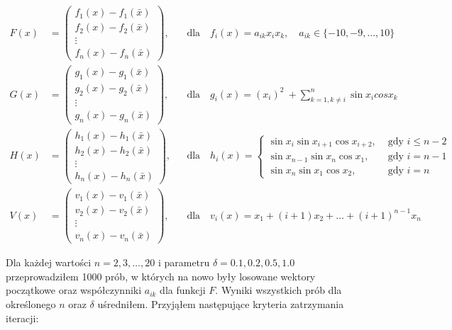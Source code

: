 \documentclass[11pt,wide]{mwart}
\begin{document}
\begin{align}
	F(x) &= 
	\left(\begin{matrix}
		f_1(x) - f_1(\bar{x}) \\ 
		f_2(x) - f_2(\bar{x}) \\ 
		\vdots\\ 
		f_n(x) - f_n(\bar{x})
	\end{matrix}\right), && \text{dla} \quad f_i(x) = a_{ik}x_ix_k, \quad a_{ik} \in \{-10, -9, \ldots, 10 \} \label{eq:F}\\
	G(x) &=
	\left(\begin{matrix}
	g_1(x) - g_1(\bar{x}) \\ 
	g_2(x) - g_2(\bar{x}) \\ 
	\vdots\\ 
	g_n(x) - g_n(\bar{x})
\end{matrix}\right), && \text{dla} \quad g_i(x) = (x_i)^2\ + \sum_{k=1, k\neq i}^{n}\sin{x_i}cos{x_k} \label{eq:G}\\
	H(x) &= 
	\left(\begin{matrix}
	h_1(x) - h_1(\bar{x}) \\ 
	h_2(x) - h_2(\bar{x}) \\ 
	\vdots\\ 
	h_n(x) - h_n(\bar{x})
\end{matrix}\right), && \text{dla} \quad h_i(x) = 
		\begin{cases}  
			\sin{x_i}\sin{x_{i+1}}\cos{x_{i+2}}, & \text{ gdy } i \leq n-2 \\
			\sin{x_{n-1}}\sin{x_{n}}\cos{x_{1}}, & \text{ gdy } i = n - 1 \\
			\sin{x_n}\sin{x_{1}}\cos{x_{2}}, & \text{ gdy } i = n
		\end{cases} \label{eq:H} \\
	V(x) &=
	\left(\begin{matrix}
		v_1(x) - v_1(\bar{x}) \\ 
		v_2(x) - v_2(\bar{x}) \\ 
		\vdots\\ 
		v_n(x) - v_n(\bar{x})
	\end{matrix}\right), && \text{dla} \quad v_i(x) = x_1 + (i+1)x_2 + \ldots + (i+1)^{n-1}x_n \label{eq:V}
\end{align}

Dla każdej wartości $ n = 2, 3, \ldots, 20 $ i parametru $ \delta = 0.1, 0.2, 0.5, 1.0 $ przeprowadziłem 1000 prób, w których na nowo były losowane wektory początkowe oraz współczynniki $ a_{ik} $ dla funkcji $ F $. Wyniki wszystkich prób dla określonego $ n $ oraz $ \delta $ uśredniłem. Przyjąłem następujące kryteria zatrzymania iteracji:
\end{document}
